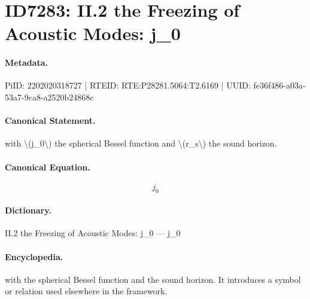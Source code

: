 \section*{ID7283: II.2 the Freezing of Acoustic Modes: j\_0}
\paragraph{Metadata.}
PiID: 2202020318727 | RTEID: RTE:P28281.5064:T2.6169 | UUID: fe36f486-a03a-53a7-9ca8-a2520b24868c

\paragraph{Canonical Statement.}
with \textbackslash{}(j\_0\textbackslash{}) the spherical Bessel function and \textbackslash{}(r\_s\textbackslash{}) the sound horizon.

\paragraph{Canonical Equation.}
\[
j_0
\]

\paragraph{Dictionary.}
II.2 the Freezing of Acoustic Modes: j\_0 — j\_0

\paragraph{Encyclopedia.}
with the spherical Bessel function and the sound horizon. It introduces a symbol or relation used elsewhere in the framework.

